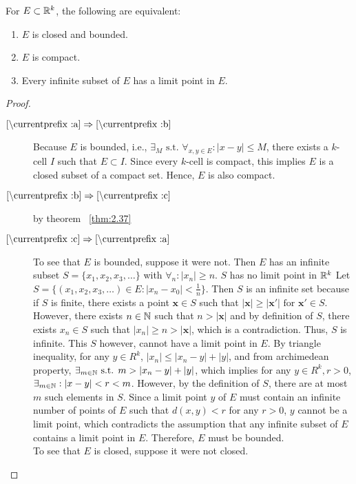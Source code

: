 \begin{thm}[41]
	\def\currentprefix{2.41}
	For $E \subset \mathbb{R}^{k}$, the following are equivalent:
	\begin{enumerate}[label=(\alph*)]
		\item $E$ is closed and bounded. 
		\item $E$ is compact. 
		\item Every infinite subset of $E$ has a limit point in $E$. 
	\end{enumerate}
	\begin{proof}
		\hfill
		\begin{description}
			\item[$\localref{a}\implies \localref{b}$] Because $E$ is bounded, i.e., $\exists_{M} \text{ s.t. } \forall_{x,y \in E}: |x-y|\le M$, there exists a $k$-cell $I$ such that $E \subset I$. Since every $k$-cell is compact, this implies $E$ is a closed subset of a compact set. Hence, $E$ is also compact.
			\item [$\localref{b}\implies \localref{c} $] by theorem ~\ref{thm:2.37}
			\item [$\localref{c} \implies \localref{a}$] To see that $E$ is bounded, suppose it were not. Then $E$ has an infinite subset $S=\{x_1,x_2,x_3,\ldots\}$ with $\forall_{n }: |x_n|\ge n$. $S$ has no limit point in $\mathbb{R} ^{k}$
			      Let $S=\{(x_1,x_2, x_3, \ldots) \in E: |x_n -x_0|<\frac{1}{n}\}$.
			      Then $S$ is an infinite set because if $S$ is finite, there exists a point $\mathbf{x} \in S$ such that $|\mathbf{x}|\ge |\mathbf{x'}| \text{ for } \mathbf{x'} \in S$.
			      However, there exists $n \in \mathbb{N}$ such that $n>|\mathbf{x}|$ and by definition of $S$, there exists $x_n \in S$ such that $|x_n|\ge n>|\mathbf{x}|$, which is a contradiction. Thus, $S$ is infinite.
			      This $S$ however, cannot have a limit point in $E$. By triangle inequality, for any $y \in R^k$, $|x_n|\le |x_n-y|+|y|$, and from archimedean property, $\exists_{m \in \mathbb{N}} \text{ s.t. } m > |x_n-y|+|y|$, which implies for any $y \in R^{k}, r>0$, $\exists_{m \in \mathbb{N}}: |x-y|<r<m$. However, by the definition of $S$, there are at most $m$ such elements in $S$. Since a limit point $y$ of $E$ must contain an infinite number of points of $E$ such that $d(x,y)<r$ for any $r>0$, $y$ cannot be a limit point, which contradicts the assumption that any infinite subset of $E$ contains a limit point in $E$. Therefore, $E$ must be bounded.\\
			      To see that $E$ is closed, suppose it were not closed.

\end{description}
\end{proof}
\end{thm}
